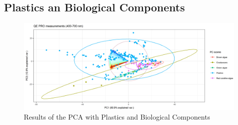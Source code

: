 \begin{appendices}
\section{Plastics an Biological Components}
\begin{figure}[H]
    \centering
    \includegraphics[width=1\textwidth]{Images/results/PCA_plastics_and_biology_scat_clust.png}
    \caption{Results of the PCA with Plastics and Biological Components}
    \label{fig:PCA_plastics_and_biology_scat}
\end{figure}



\end{appendices}

